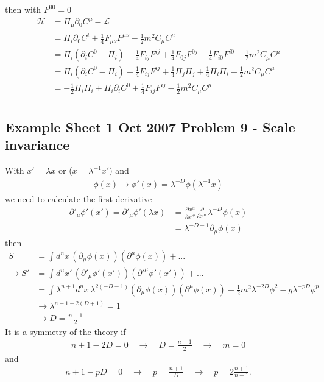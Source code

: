 \documentclass[10pt,a4paper]{book}
\theoremstyle{definition}
\begin{document}
then with $F^{00}=0$
\begin{align}
\mathcal{H}
&=\Pi_\mu\partial_0C^\mu-\mathcal{L}\\
&=\Pi_i\partial_0C^i+\frac{1}{4}F_{\mu\nu}F^{\mu\nu}-\frac{1}{2}m^2C_\mu C^\mu\\
&=\Pi_i(\partial_iC^0-\Pi_i)+\frac{1}{4}F_{ij}F^{ij}+\frac{1}{4}F_{0j}F^{0j}+\frac{1}{4}F_{i0}F^{i0}-\frac{1}{2}m^2C_\mu C^\mu\\
&=\Pi_i(\partial_iC^0-\Pi_i)+\frac{1}{4}F_{ij}F^{ij}+\frac{1}{4}\Pi_j\Pi_j+\frac{1}{4}\Pi_i\Pi_i-\frac{1}{2}m^2C_\mu C^\mu\\
&=-\frac{1}{2}\Pi_i\Pi_i+\Pi_i\partial_iC^0+\frac{1}{4}F_{ij}F^{ij}-\frac{1}{2}m^2C_\mu C^\mu\\
\end{align}

\subsection{Example Sheet 1 Oct 2007 Problem 9 - Scale invariance}
With $x'=\lambda x$ or ($x=\lambda^{-1}x'$) and
\begin{align}
\phi(x)\rightarrow\phi'(x)=\lambda^{-D}\phi(\lambda^{-1}x)
\end{align}
we need to calculate the first derivative
\begin{align}
\partial'_\mu\phi'(x')
=\partial'_\mu\phi'(\lambda x)
&=\frac{\partial x^\alpha}{\partial x'^\mu}\frac{\partial}{\partial x^\alpha}\lambda^{-D}\phi(x)\\
&=\lambda^{-D-1}\partial_\mu\phi(x)
\end{align}
then
\begin{align}
S
&=\int d^nx\,(\partial_\mu\phi(x))(\partial^\mu\phi(x))+...\\
\rightarrow S'
&=\int d^nx'\,(\partial'_\mu\phi'(x'))(\partial'^\mu\phi'(x'))+...\\
&=\int \lambda^{n+1}d^nx\,\lambda^{2(-D-1)}(\partial_\mu\phi(x))(\partial^\mu\phi(x))-\frac{1}{2}m^2\lambda^{-2D}\phi^2-g\lambda^{-pD}\phi^p\\
&\rightarrow \lambda^{n+1-2(D+1)}=1\\
&\rightarrow D=\frac{n-1}{2}
\end{align}
It is a symmetry of the theory if
\begin{align}
n+1-2D=0\quad\rightarrow\quad D=\frac{n+1}{2} \quad\rightarrow\quad m=0
\end{align}
and
\begin{align}
n+1-pD=0\quad\rightarrow\quad p=\frac{n+1}{D}\quad\rightarrow\quad p=2\frac{n+1}{n-1}.
\end{align}
\end{document}
